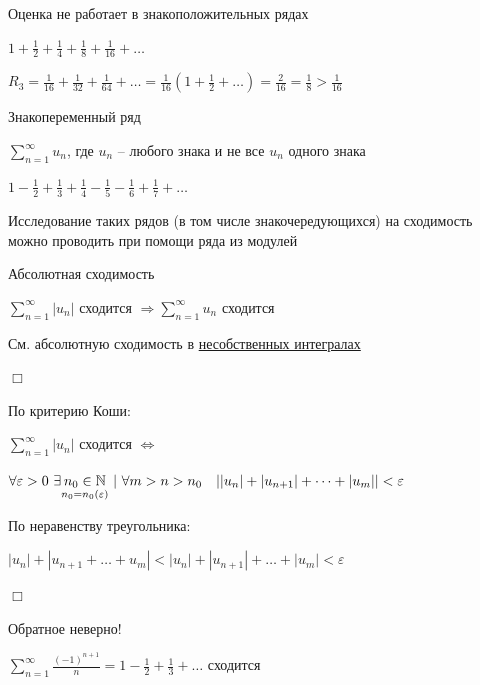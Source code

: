\documentclass[12pt]{article}
\begin{document}
    \Nota Оценка не работает в знакоположительных рядах

    $1 + \frac{1}{2} + \frac{1}{4} + \frac{1}{8} + \frac{1}{16} + \dots$

    $R_3 = \frac{1}{16} + \frac{1}{32} + \frac{1}{64} + \dots = \frac{1}{16} \left(1 + \frac{1}{2} + \dots\right) = \frac{2}{16} = \frac{1}{8} > \frac{1}{16}$

    \hypertarget{changingsignseries}{}

    \Def Знакопеременный ряд

    $\sum_{n = 1}^\infty u_n$, где $u_n$ -- любого знака и не все $u_n$ одного знака

    \Ex $1 - \frac{1}{2} + \frac{1}{3} + \frac{1}{4} - \frac{1}{5} - \frac{1}{6} + \frac{1}{7} + \dots$

    \Nota Исследование таких рядов (в том числе знакочередующихся) на сходимость можно проводить при помощи ряда из модулей

    \hypertarget{absoluteconvergence}{}

    \begin{MyTheorem}
        \Ths Абсолютная сходимость

        $\sum_{n = 1}^\infty |u_n|$ сходится $\Longrightarrow \sum_{n = 1}^\infty u_n$ сходится
    \end{MyTheorem}

    \Mems См. абсолютную сходимость в \href{https://pelmesh619.github.io/itmo_conspects/conspects/calculus/calculus_superconspect.pdf}{несобственных интегралах}

    \begin{MyProof}
        $\Box$

        По критерию Коши:

        $\sum_{n = 1}^\infty |u_n|$ сходится $\Longleftrightarrow$

        $\forall \varepsilon > 0 \ \exists \underset{n_0 = n_0(\varepsilon)}{n_0 \in \mathbb{N}} \ | \ \forall m > n > n_0 \quad ||u_n| + |u_{n + 1}| + \dots + |u_m|| < \varepsilon$

        По неравенству треугольника:

        $|u_n| + |u_{n + 1} + \dots + u_m| < |u_n| + |u_{n + 1}| + \dots + |u_m| < \varepsilon$

        $\Box$
    \end{MyProof}

    \Notas Обратное неверно!

    \Ex $\sum_{n = 1}^\infty \frac{(-1)^{n + 1}}{n} = 1 - \frac{1}{2} + \frac{1}{3} + \dots $ сходится
\end{document}
